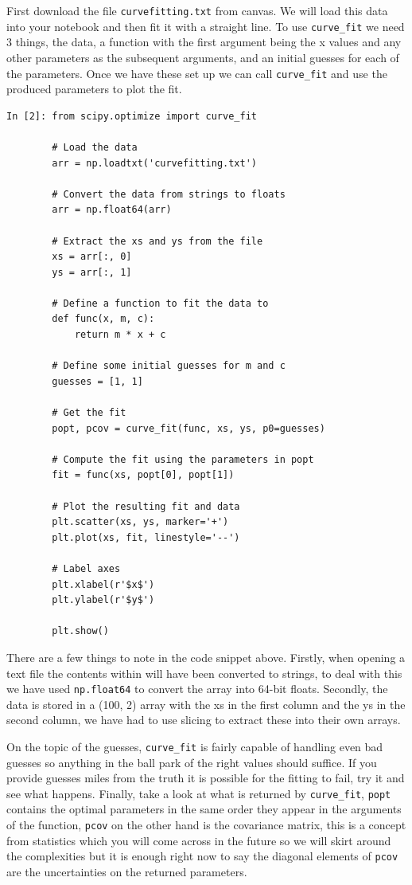 First download the file \texttt{curvefitting.txt} from canvas. We will load this data into your notebook and then fit it with a straight line. To use \texttt{curve\_fit} we need 3 things, the data, a function with the first argument being the x values and any other parameters as the subsequent arguments, and an initial guesses for each of the parameters. Once we have these set up we can call \texttt{curve\_fit} and use the produced parameters to plot the fit.

\begin{lstlisting}[style=PY]
In [2]: from scipy.optimize import curve_fit

        # Load the data
        arr = np.loadtxt('curvefitting.txt')
        
        # Convert the data from strings to floats
        arr = np.float64(arr)
        
        # Extract the xs and ys from the file
        xs = arr[:, 0]
        ys = arr[:, 1]
        
        # Define a function to fit the data to
        def func(x, m, c):
            return m * x + c
        
        # Define some initial guesses for m and c
        guesses = [1, 1]
        
        # Get the fit
        popt, pcov = curve_fit(func, xs, ys, p0=guesses)
        
        # Compute the fit using the parameters in popt
        fit = func(xs, popt[0], popt[1])
        
        # Plot the resulting fit and data
        plt.scatter(xs, ys, marker='+')
        plt.plot(xs, fit, linestyle='--')
        
        # Label axes
        plt.xlabel(r'$x$')
        plt.ylabel(r'$y$')
        
        plt.show()
\end{lstlisting}

There are a few things to note in the code snippet above. Firstly, when opening a text file the contents within will have been converted to strings, to deal with this we have used \texttt{np.float64} to convert the array into 64-bit floats. Secondly, the data is stored in a (100, 2) array with the xs in the first column and the ys in the second column, we have had to use slicing to extract these into their own arrays. 

On the topic of the guesses, \texttt{curve\_fit} is fairly capable of handling even bad guesses so anything in the ball park of the right values should suffice. If you provide guesses miles from the truth it is possible for the fitting to fail, try it and see what happens. Finally, take a look at what is returned by \texttt{curve\_fit}, \texttt{popt} contains the optimal parameters in the same order they appear in the arguments of the function, \texttt{pcov} on the other hand is the covariance matrix, this is a concept from statistics which you will come across in the future so we will skirt around the complexities but it is enough right now to say the diagonal elements of \texttt{pcov} are the uncertainties on the returned parameters.

